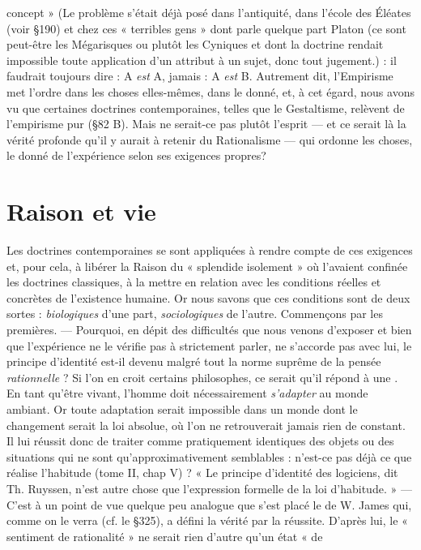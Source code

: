 concept » {\scriptsize (Le problème s'était déjà posé dans l'antiquité, dans l’école des Éléates (voir \S 190)
et chez ces « terribles gens » dont parle quelque part Platon (ce sont peut-être les Mégarisques ou plutôt les Cyniques et dont la doctrine rendait impossible toute application
d'un attribut à un sujet, donc tout jugement.)} : il faudrait toujours dire : A {\it est} A, jamais : A {\it est} B. Autrement dit, l’Empirisme met l’ordre dans les choses elles-mêmes, dans
le donné, et, à cet égard, nous avons vu que certaines doctrines
contemporaines, telles que le Gestaltisme, relèvent de l’empirisme pur
(\S 82 B). Mais ne serait-ce pas plutôt l’esprit — et ce serait là la vérité
profonde qu’il y aurait à retenir du Rationalisme — qui ordonne les
choses, le donné de l’expérience selon ses exigences propres?

\section{Raison et vie}%
Les doctrines contemporaines se sont
appliquées à rendre compte de ces exigences et, pour cela, à libérer la
Raison du « splendide isolement » où l’avaient confinée les doctrines
classiques, à la mettre en relation avec les conditions réelles et
concrètes de l’existence humaine. Or nous savons que ces conditions
sont de deux sortes : {\it biologiques} d’une part, {\it sociologiques} de l’autre.
Commençons par les premières. — Pourquoi, en dépit des difficultés
que nous venons d’exposer et bien que l’expérience ne le vérifie pas
à strictement parler, ne s'accorde pas avec lui, le principe d’identité
est-il devenu malgré tout la norme suprême de la pensée {\it rationnelle} ?
Si l’on en croit certains philosophes, ce serait qu’il répond à une
. En tant qu'être vivant, l’homme doit nécessairement
{\it s'adapter} au monde ambiant. Or toute adaptation serait impossible
dans un monde dont le changement serait la loi absolue, où l’on ne
retrouverait jamais rien de constant. Il lui réussit donc de traiter
comme pratiquement identiques des objets ou des situations qui ne
sont qu’approximativement semblables : n’est-ce pas déjà ce que
réalise l'habitude (tome II, chap V) ? « Le principe d'identité des
logiciens, dit Th. Ruyssen, n’est autre chose que l’expression formelle de la loi d'habitude. » — C’est à un point de vue quelque peu
analogue que s’est placé le  de W. James qui, comme on
le verra (cf. le \S 325), a défini la vérité par la réussite. D’après lui,
le « sentiment de rationalité » ne serait rien d’autre qu’un état « de
